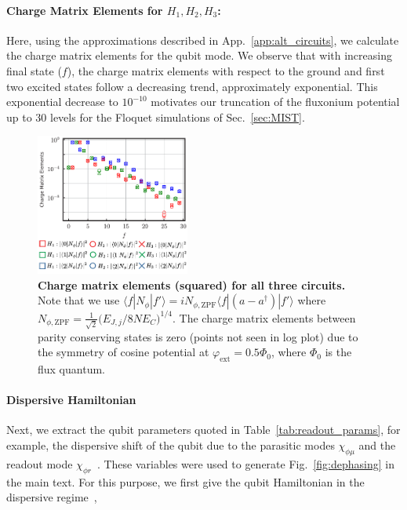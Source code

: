 \documentclass[%
reprint,
superscriptaddress,
 amsmath,amssymb,
 aps,
 prx,
longbibliography,
floatfix,
]{revtex4-2}
\begin{document}
\paragraph{Charge Matrix Elements for $H_1,H_2,H_3$:}
Here, using the approximations described in App.~\ref{app:alt_circuits}, we calculate the charge matrix elements for the qubit mode. We observe that with increasing final state ($f$), the charge matrix elements with respect to the ground and first two excited states follow a decreasing trend, approximately exponential. This exponential decrease to $10^{-10}$ motivates our truncation of the fluxonium potential up to $30$ levels for the Floquet simulations of Sec.~\ref{sec:MIST}.
\begin{figure}[hbt]
    \centering
\includegraphics[width=0.45\textwidth]{Supp_Fig/Charge_Matrix.pdf}
    \caption{{\bf Charge matrix 
 elements (squared) for all three circuits.} Note that we use $\langle f|N_\phi|f'\rangle=iN_{\phi,\mathrm{ZPF}}\langle f|(a-a^\dagger)|f'\rangle$ where $N_{\phi,\mathrm{ZPF}}=\frac{1}{\sqrt{2}}\Big(E_{J,j}/8NE_C\Big)^{1/4}$. The charge matrix elements between parity conserving states is zero (points not seen in log plot) due to the symmetry of cosine potential at $\varphi_\mathrm{ext}=0.5\Phi_0$, where $\Phi_0$ is the flux quantum.}
    \label{charge-matrix}
\end{figure}


\paragraph{Dispersive Hamiltonian}\label{app:dispersive}
Next, we extract the qubit parameters quoted in Table~\ref{tab:readout_params}, for example, the dispersive shift of the qubit due to the parasitic modes $\chi_{\phi\mu}$ and the readout mode $\chi_{\phi r}$~\cite{viola2015collective}. These variables were used to generate Fig.~\ref{fig:dephasing} in the main text. For this purpose, we first give the qubit Hamiltonian in the dispersive regime~\cite{viola2015collective},
\end{document}
